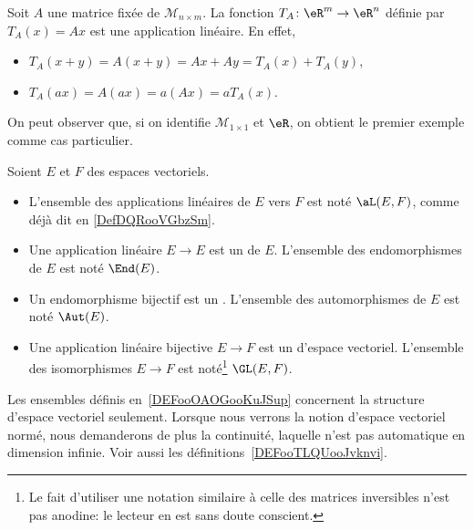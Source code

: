 \begin{example}\label{exampleT_A}
	Soit $A$ une matrice fixée de $\mathcal{M}_{n\times m}$. La fonction $T_A\colon \eR^m\to \eR^n$ définie par $T_A(x)=Ax$ est une application linéaire. En effet,
    \begin{itemize}
        \item  $T_A(x+y)= A(x+y)= Ax + Ay = T_A(x)+T_A(y)$,
        \item $T_A(ax)=A(ax)= a(Ax) = a T_A(x)$.
    \end{itemize}
\end{example}

On peut observer que, si on identifie $\mathcal{M}_{1\times 1}$ et $\eR$, on obtient le premier exemple comme cas particulier.

\begin{definition}      \label{DEFooOAOGooKuJSup}
    Soient \( E\) et \( F\) des espaces vectoriels.
    \begin{itemize}
        \item
            L'ensemble des applications linéaires de \( E\) vers \( F\) est noté $\aL(E,F)$, comme déjà dit en \ref{DefDQRooVGbzSm}.
        \item Une application linéaire \( E\to E\) est un  de \( E\). L'ensemble des endomorphismes de \( E\) est noté \( \End(E)\).
        \item Un endomorphisme bijectif est un . L'ensemble des automorphismes de \( E\) est noté \( \Aut(E)\).
        \item
            Une application linéaire bijective \( E\to F\) est un  d'espace vectoriel. L'ensemble des isomorphismes \( E\to F\) est noté\footnote{Le fait d'utiliser une notation similaire à celle des matrices inversibles n'est pas anodine: le lecteur en est sans doute conscient.} \( \GL(E,F)\).
    \end{itemize}
\end{definition}

\begin{remark}
    Les ensembles définis en~\ref{DEFooOAOGooKuJSup} concernent la structure d'espace vectoriel seulement. Lorsque nous verrons la notion d'espace vectoriel normé, nous demanderons de plus la continuité, laquelle n'est pas automatique en dimension infinie. Voir aussi les définitions~\ref{DEFooTLQUooJvknvi}.
\end{remark}

